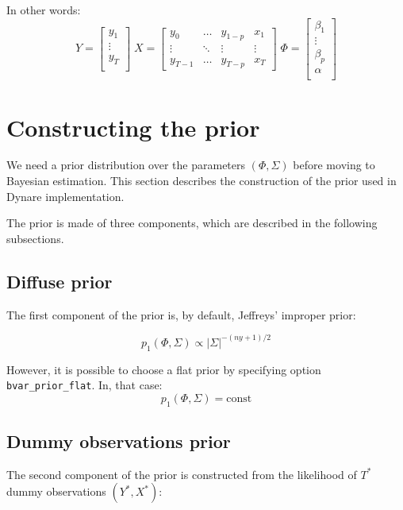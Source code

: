 \documentclass[10pt,a4paper]{article}
\begin{document}
In other words:
$$Y = \left[
\begin{array}{c}
y_1 \\
\vdots \\
y_T \\
\end{array}
\right]
\; X = \left[
\begin{array}{cccc}
y_0 & \ldots & y_{1-p} & x_1 \\
\vdots & \ddots & \vdots & \vdots \\
y_{T-1} & \ldots & y_{T-p} & x_T
\end{array}
\right]
\; \Phi = \left[
\begin{array}{c}
\beta_1 \\
\vdots \\
\beta_p \\
\alpha \\
\end{array}
\right]$$


\section{Constructing the prior}
\label{sec-prior}

We need a prior distribution over the parameters $(\Phi, \Sigma)$ before moving to Bayesian estimation. This section describes the construction of the prior used in Dynare implementation.

The prior is made of three components, which are described in the following subsections.

\subsection{Diffuse prior}

The first component of the prior is, by default, Jeffreys' improper prior:

$$p_1(\Phi,\Sigma) \propto |\Sigma|^{-(ny+1)/2}$$

However, it is possible to choose a flat prior by specifying option \texttt{bvar\_prior\_flat}. In, that case:
$$p_1(\Phi, \Sigma) = \text{const}$$

\subsection{Dummy observations prior}

The second component of the prior is constructed from the likelihood of $T^*$ dummy observations $(Y^*,X^*)$:
\end{document}
